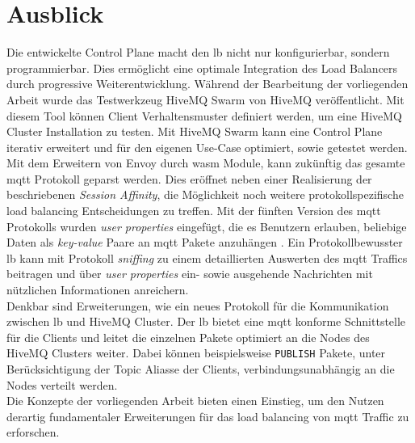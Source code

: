\section{Ausblick}
Die entwickelte Control Plane macht den \acl{lb} nicht nur konfigurierbar, sondern programmierbar. Dies ermöglicht eine optimale Integration des Load Balancers durch progressive Weiterentwicklung.
Während der Bearbeitung der vorliegenden Arbeit wurde das Testwerkzeug HiveMQ Swarm \cite{teamHiveMQSwarmFind} von HiveMQ veröffentlicht. Mit diesem Tool können Client Verhaltensmuster definiert werden, um eine HiveMQ Cluster Installation zu testen.
Mit HiveMQ Swarm kann eine Control Plane iterativ erweitert und für den eigenen Use-Case optimiert, sowie getestet werden.
\\
Mit dem Erweitern von Envoy durch \ac{wasm} Module, kann zukünftig das gesamte \ac{mqtt} Protokoll geparst werden.
Dies eröffnet neben einer Realisierung der beschriebenen \textit{Session Affinity}, die Möglichkeit noch weitere protokollspezifische load balancing Entscheidungen zu treffen.
Mit der fünften Version des \ac{mqtt} Protokolls wurden \textit{user properties} eingefügt, die es Benutzern erlauben, beliebige Daten als \textit{key-value} Paare an \ac{mqtt} Pakete anzuhängen \cite{raschbichlerMQTTHowNewa}.
Ein Protokollbewusster \acl{lb} kann mit Protokoll \textit{sniffing} zu einem detaillierten Auswerten des \ac{mqtt} Traffics beitragen und über \textit{user properties} ein- sowie ausgehende Nachrichten mit nützlichen Informationen anreichern.
\\
Denkbar sind Erweiterungen, wie ein neues Protokoll für die Kommunikation zwischen \acl{lb} und HiveMQ Cluster.
Der \acl{lb} bietet eine \ac{mqtt} konforme Schnittstelle für die Clients und leitet die einzelnen Pakete optimiert an die Nodes des HiveMQ Clusters weiter.
Dabei können beispielsweise \verb|PUBLISH| Pakete, unter Berücksichtigung der Topic Aliasse der Clients, verbindungsunabhängig an die Nodes verteilt werden.
\\
Die Konzepte der vorliegenden Arbeit bieten einen Einstieg, um den Nutzen derartig fundamentaler Erweiterungen für das load balancing von \ac{mqtt} Traffic zu erforschen.

